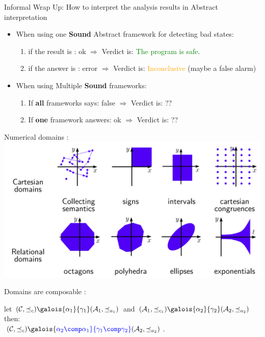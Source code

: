 \begin{frame}{Informal Wrap Up: How to interpret the analysis results in Abstract interpretation}
\begin{itemize}
	\item When using one \textbf{Sound} Abstract framework for detecting bad states:
	\begin{enumerate}
		\item if the result is : ok $\Rightarrow$ Verdict is: \textcolor{green}{ The program is safe}.
		\item if the answer is : error $\Rightarrow$ Verdict is: \textcolor{orange}{Inconclusive} (maybe a false alarm)
	\end{enumerate}	
	\item When using  Multiple \textbf{Sound} frameworks:
\begin{enumerate}
	\item If \textbf{all} frameworks says: false $\Rightarrow$ Verdict is: ??
	\item If \textbf{one} framework answers: ok  $\Rightarrow$ Verdict is: ??
\end{enumerate}	
	
\end{itemize}
\end{frame}


\begin{frame}{Numerical domains :}
\centering \includegraphics[scale=0.45]{content/images/static-analysis/domains.png}
\end{frame}

\begin{frame}{Domains are composable :}
\begin{theorem}
	let $(\mathcal{C}, \preceq_c) \galois{\alpha_1}{\gamma_1} (\mathcal{A}_1, \preceq_{a_1})$ and $(\mathcal{A}_1, \preceq_{c_1}) \galois{\alpha_2}{\gamma_2} (\mathcal{A}_2, \preceq_{a_2})$ then:\\
	$(\mathcal{C}, \preceq_c) \galois{\color{blue}{\alpha_2 \comp \alpha_1}}{\color{blue}{\gamma_1 \comp \gamma_2}} (\mathcal{A}_2, \preceq_{a_2})$.
\end{theorem}
\end{frame}


